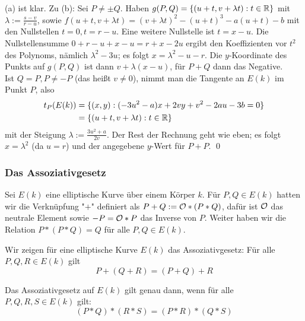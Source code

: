 	(a) ist klar. 
	Zu (b): Sei $P \neq \pm Q$. 
	Haben $g(P,Q) = \{ (u+t,v + \lambda t) : t \in \mathbb{R}\}$ mit $\lambda := \frac{s-v}{r-u}$, sowie $f(u+t, v+ \lambda t) = (v + \lambda t)^2 - (u+t)^3 - a(u+t) - b$ mit den Nullstellen $t = 0, t = r-u$. 
	Eine weitere Nullstelle ist $t = x-u$. 
	Die Nullstellensumme $0 + r-u + x - u = r + x - 2u$ ergibt den Koeffizienten vor $t^2$ des Polynoms, nämlich $\lambda^2 - 3u$; es folgt $x = \lambda^2 - u - r$. 
	Die $y$-Koordinate des Punkts auf $g(P,Q)$ ist dann $v + \lambda(x - u)$, für $P+Q$ dann das Negative. \\
	Ist $Q = P, P \neq -P$ (das heißt $v \neq 0$), nimmt man die Tangente an $E(k)$ im Punkt $P$, also
	\begin{equation}
	\begin{aligned}
		t_P(E(k)) &= \{(x,y) : (-3u^2 - a)x + 2vy + v^2 - 2au - 3b = 0\} \\
		&= \{ (u+t, v+ \lambda t) : t \in \mathbb{R}\}
	\end{aligned}
	\end{equation}
	mit der Steigung $\lambda := \frac{3u^2 + a}{2v}$. 
	Der Rest der Rechnung geht wie eben; es folgt $x = \lambda^2$ (da $u=r$) und der angegebene $y$-Wert für $P+P$. \qed
	
\nextlecture
\subsubsection{Das Assoziativgesetz}
	Sei $E(k)$ eine elliptische Kurve über einem Körper $k$.\marginnote{[14]} Für $P,Q \in E(k)$ hatten wir die Verknüpfung "$+$" definiert als $P+Q := \mathcal{O} * (P * Q)$, dafür ist $\mathcal{O}$ das neutrale Element sowie $-P = \mathcal{O} * P$ das Inverse von $P$. 
	Weiter haben wir die Relation $P * (P * Q) = Q$ für alle $P,Q \in E(k)$.
	
\begin{bem}
	Wir zeigen für eine elliptische Kurve $E(k)$ das Assoziativgesetz: Für alle $P,Q,R \in E(k)$ gilt
	\[ P + (Q + R) = (P + Q) + R \]
\end{bem}

\begin{lemma}
\label{lemma_14.2}
	Das Assoziativgesetz auf $E(k)$ gilt genau dann, wenn für alle $P,Q,R,S \in E(k)$ gilt:
	\[ (P*Q)*(R*S) = (P*R)*(Q*S) \]
\end{lemma}

